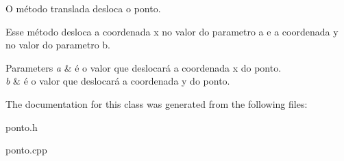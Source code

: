 O método translada desloca o ponto. 

Esse método desloca a coordenada x no valor do parametro a e a coordenada y no valor do parametro b. 
\begin{DoxyParams}{Parameters}
{\em a} & é o valor que deslocará a coordenada x do ponto. \\
\hline
{\em b} & é o valor que deslocará a coordenada y do ponto. \\
\hline
\end{DoxyParams}


The documentation for this class was generated from the following files\+:\begin{DoxyCompactItemize}
\item 
ponto.\+h\item 
ponto.\+cpp\end{DoxyCompactItemize}
